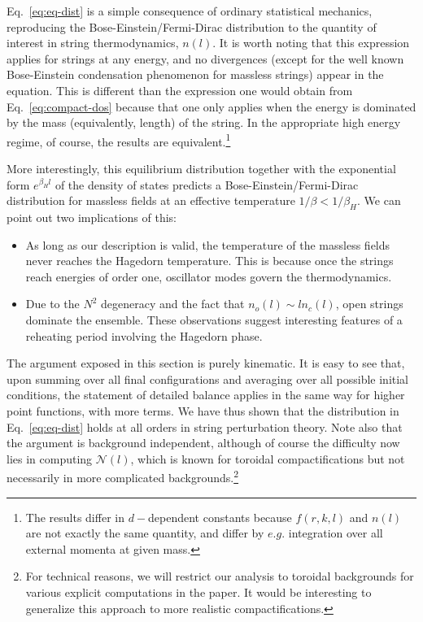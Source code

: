 \documentclass[a4paper,11pt]{article}
\begin{document}
Eq.~\eqref{eq:eq-dist} is a simple consequence of ordinary statistical mechanics, reproducing the Bose-Einstein/Fermi-Dirac distribution to the quantity of interest in string thermodynamics, $n(l)$. 
It is worth noting that this expression applies for strings at any energy, and no divergences (except for the well known Bose-Einstein condensation phenomenon for massless strings) appear in the equation.
This is different than the expression one would obtain from Eq.~\eqref{eq:compact-dos} because that one only applies when the energy is dominated by the mass (equivalently, length) of the string.
In the appropriate high energy regime, of course, the results are equivalent.\footnote{The results differ in $d-$dependent constants because $f(r,k,l)$ and $n(l)$ are not exactly the same quantity, and differ by $e.g.$ integration over all external momenta at given mass.}

More interestingly, this equilibrium distribution together with the exponential form $e^{\beta_H l}$ of the density of states predicts a Bose-Einstein/Fermi-Dirac distribution for massless fields at an effective temperature $1/\beta<1/\beta_H$. 
We can point out two implications of this:
\begin{itemize}
    \item As long as our description is valid, the temperature of the massless fields never reaches the Hagedorn temperature.
    This is because once the strings reach energies of order one, oscillator modes govern the thermodynamics. 
    \item Due to the $N^2$ degeneracy and the fact that $n_o(l)\sim ln_c(l)$, open strings dominate the ensemble. 
    These observations suggest interesting features of a reheating period involving the Hagedorn phase.
\end{itemize}


The argument exposed in this section is purely kinematic. 
It is easy to see that, upon summing over all final configurations and averaging over all possible initial conditions, the statement of detailed balance applies in the same way for higher point functions, with more terms.
We have thus shown that the distribution in Eq.~\eqref{eq:eq-dist} holds at all orders in string perturbation theory. 
Note also that the argument is background independent, although of course the difficulty now lies in computing $\mathcal{N}(l)$, which is known for toroidal compactifications but not necessarily in more complicated backgrounds.\footnote{For technical reasons, we will  restrict our analysis to toroidal backgrounds for various explicit computations in the paper.
It would be interesting to generalize this approach to more realistic compactifications.} 
\end{document}
